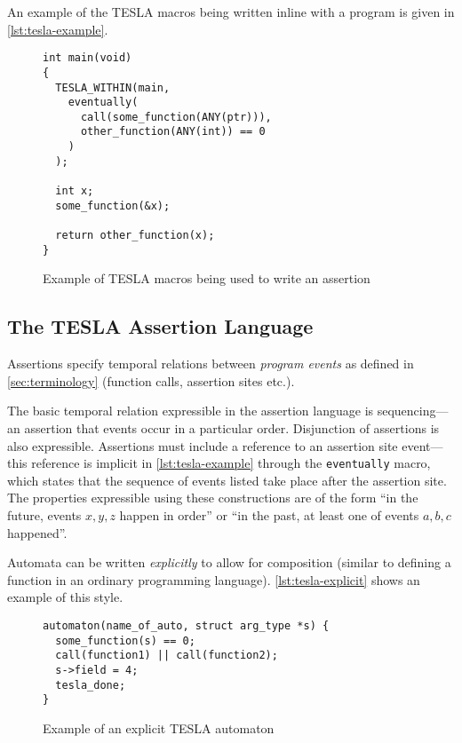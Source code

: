 An example of the TESLA macros being written inline with a program is
given in \autoref{lst:tesla-example}.

\begin{figure}
  \begin{verbatim}
int main(void)
{
  TESLA_WITHIN(main,
    eventually(
      call(some_function(ANY(ptr))),
      other_function(ANY(int)) == 0
    )
  );

  int x;
  some_function(&x);

  return other_function(x);
}
  \end{verbatim}
  \caption{Example of TESLA macros being used to write an assertion}
  \label{lst:tesla-example}
\end{figure}

\subsection{The TESLA Assertion Language} \label{sec:assertions}

Assertions specify temporal relations between \emph{program events} as defined
in \autoref{sec:terminology} (function calls, assertion sites etc.).

The basic temporal relation expressible in the assertion language is
sequencing---an assertion that events occur in a particular order. Disjunction
of assertions is also expressible. Assertions must include a reference to an
assertion site event---this reference is implicit in \autoref{lst:tesla-example}
through the \texttt{eventually} macro, which states that the sequence of
events listed take place after the assertion site. The properties expressible
using these constructions are of the form ``in the future, events $x, y, z$
happen in order'' or ``in the past, at least one of events $a, b, c$ happened''.

Automata can be written \emph{explicitly} to allow for composition (similar to
defining a function in an ordinary programming language).
\autoref{lst:tesla-explicit} shows an example of this style.

\begin{figure}
  \begin{verbatim}
automaton(name_of_auto, struct arg_type *s) {
  some_function(s) == 0;
  call(function1) || call(function2);
  s->field = 4;
  tesla_done;
}
  \end{verbatim}
  \caption{Example of an explicit TESLA automaton}
  \label{lst:tesla-explicit}
\end{figure}

